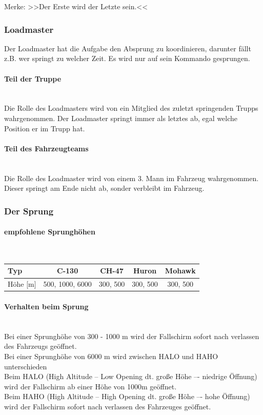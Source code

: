 	\qquad Merke: >>Der Erste wird der Letzte sein.<< 

\subsubsection{Loadmaster}
	Der Loadmaster hat die Aufgabe den Absprung zu koordinieren, darunter fällt z.B. wer springt zu welcher Zeit. Es wird nur auf sein Kommando gesprungen.

\paragraph{Teil der Truppe} \hfil\\
	Die Rolle des Loadmasters wird von ein Mitglied des zuletzt springenden Trupps wahrgenommen. Der Loadmaster springt immer als letztes ab, egal welche Position er im Trupp hat.

\paragraph{Teil des Fahrzeugteams} \hfil\\
	Die Rolle des Loadmaster wird von einem 3. Mann im Fahrzeug wahrgenommen. Dieser springt am Ende nicht ab, sonder verbleibt im Fahrzeug.

\subsubsection{Der Sprung}

\paragraph{empfohlene Sprunghöhen} \hfil\\
\begin{longtable}{|l|c|c|c|c|}
	\hline
	Typ	&	C-130 	&	CH-47 	&	Huron	&	Mohawk	\\ 
	\hline
	Höhe [m]	&	500, 1000, 6000	& 300, 500	&	300, 500	&	300, 500 \\ 
	\hline
\end{longtable}

\paragraph{Verhalten beim Sprung} \hfil\\
	Bei einer Sprunghöhe von 300 - 1000 m wird der Fallschirm sofort nach verlassen des Fahrzeugs geöffnet.\\
	Bei einer Sprunghöhe von 6000 m wird zwischen HALO und HAHO unterschieden \\
	Beim HALO (High Altitude – Low Opening dt. große Höhe –- niedrige Öffnung) wird der Fallschirm ab einer Höhe von 1000m geöffnet. \\
	Beim HAHO (High Altitude – High Opening dt. große Höhe –- hohe Öffnung) wird der Fallschirm sofort nach verlassen des Fahrzeuges geöffnet.


